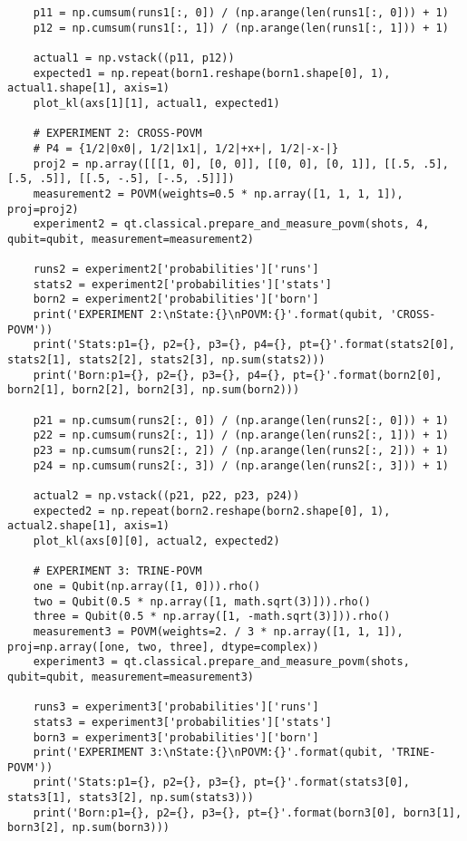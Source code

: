 \begin{verbatim}
    p11 = np.cumsum(runs1[:, 0]) / (np.arange(len(runs1[:, 0])) + 1)
    p12 = np.cumsum(runs1[:, 1]) / (np.arange(len(runs1[:, 1])) + 1)

    actual1 = np.vstack((p11, p12))
    expected1 = np.repeat(born1.reshape(born1.shape[0], 1), actual1.shape[1], axis=1)
    plot_kl(axs[1][1], actual1, expected1)

    # EXPERIMENT 2: CROSS-POVM
    # P4 = {1/2|0x0|, 1/2|1x1|, 1/2|+x+|, 1/2|-x-|}
    proj2 = np.array([[[1, 0], [0, 0]], [[0, 0], [0, 1]], [[.5, .5], [.5, .5]], [[.5, -.5], [-.5, .5]]])
    measurement2 = POVM(weights=0.5 * np.array([1, 1, 1, 1]), proj=proj2)
    experiment2 = qt.classical.prepare_and_measure_povm(shots, 4, qubit=qubit, measurement=measurement2)

    runs2 = experiment2['probabilities']['runs']
    stats2 = experiment2['probabilities']['stats']
    born2 = experiment2['probabilities']['born']
    print('EXPERIMENT 2:\nState:{}\nPOVM:{}'.format(qubit, 'CROSS-POVM'))
    print('Stats:p1={}, p2={}, p3={}, p4={}, pt={}'.format(stats2[0], stats2[1], stats2[2], stats2[3], np.sum(stats2)))
    print('Born:p1={}, p2={}, p3={}, p4={}, pt={}'.format(born2[0], born2[1], born2[2], born2[3], np.sum(born2)))

    p21 = np.cumsum(runs2[:, 0]) / (np.arange(len(runs2[:, 0])) + 1)
    p22 = np.cumsum(runs2[:, 1]) / (np.arange(len(runs2[:, 1])) + 1)
    p23 = np.cumsum(runs2[:, 2]) / (np.arange(len(runs2[:, 2])) + 1)
    p24 = np.cumsum(runs2[:, 3]) / (np.arange(len(runs2[:, 3])) + 1)

    actual2 = np.vstack((p21, p22, p23, p24))
    expected2 = np.repeat(born2.reshape(born2.shape[0], 1), actual2.shape[1], axis=1)
    plot_kl(axs[0][0], actual2, expected2)

    # EXPERIMENT 3: TRINE-POVM
    one = Qubit(np.array([1, 0])).rho()
    two = Qubit(0.5 * np.array([1, math.sqrt(3)])).rho()
    three = Qubit(0.5 * np.array([1, -math.sqrt(3)])).rho()
    measurement3 = POVM(weights=2. / 3 * np.array([1, 1, 1]), proj=np.array([one, two, three], dtype=complex))
    experiment3 = qt.classical.prepare_and_measure_povm(shots, qubit=qubit, measurement=measurement3)

    runs3 = experiment3['probabilities']['runs']
    stats3 = experiment3['probabilities']['stats']
    born3 = experiment3['probabilities']['born']
    print('EXPERIMENT 3:\nState:{}\nPOVM:{}'.format(qubit, 'TRINE-POVM'))
    print('Stats:p1={}, p2={}, p3={}, pt={}'.format(stats3[0], stats3[1], stats3[2], np.sum(stats3)))
    print('Born:p1={}, p2={}, p3={}, pt={}'.format(born3[0], born3[1], born3[2], np.sum(born3)))


\end{verbatim}
